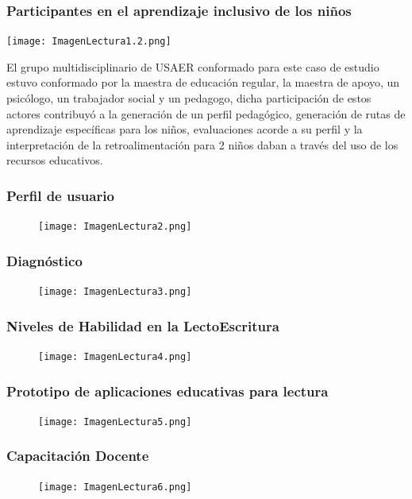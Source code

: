 \documentclass[11pt]{beamer}
\begin{document}
\begin{frame}
\frametitle{Participantes en el aprendizaje inclusivo de los niños}
    \justify
    \begin{minipage}[c]{0.4\textwidth} 
    \texttt{[image: ImagenLectura1.2.png]} 
    \end{minipage}
    \begin{minipage}[c]{0.55\textwidth}
        El grupo multidisciplinario de USAER conformado para este caso de estudio estuvo conformado por la maestra de educación regular, la maestra de apoyo, un psicólogo, un trabajador social y un pedagogo, dicha participación de estos actores contribuyó a la generación de un perfil pedagógico, generación de rutas de aprendizaje específicas para los niños, evaluaciones acorde a su  perfil y la interpretación de la retroalimentación para 2 niños daban a través del uso de los recursos educativos.
    \end{minipage}
\end{frame}

\begin{frame}
\frametitle{Perfil de usuario}
    \begin{figure}
    \centering
     \texttt{[image: ImagenLectura2.png]}
    \end{figure}
\end{frame}

\begin{frame}
\frametitle{Diagnóstico}
    \begin{figure}
    \centering
     \texttt{[image: ImagenLectura3.png]}
    \end{figure}
\end{frame}

\begin{frame}
\frametitle{Niveles de Habilidad en la LectoEscritura}
    \begin{figure}
    \centering
     \texttt{[image: ImagenLectura4.png]}
    \end{figure}
\end{frame}

\begin{frame}
\frametitle{Prototipo de aplicaciones educativas para lectura}
    \begin{figure}
    \centering
     \texttt{[image: ImagenLectura5.png]}
    \end{figure}
\end{frame}

\begin{frame}
\frametitle{Capacitación Docente}
    \begin{figure}
    \centering
     \texttt{[image: ImagenLectura6.png]}
    \end{figure}
\end{frame}
\end{document}
